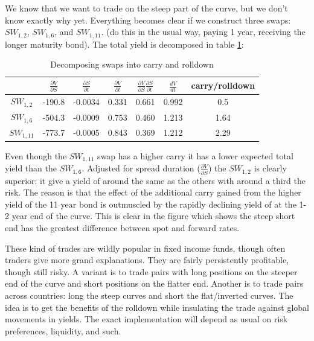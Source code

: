 We know that we want to trade on the steep part of the curve, but we don't know exactly why yet. Everything becomes clear if we construct three swaps: $SW_{1,2}$, $SW_{1,6}$, and $SW_{1,11}$. (do this in the usual way, paying 1 year, receiving the longer maturity bond). The total yield is decomposed in table \ref{tab:decomposeSwap}:

\begin{center}
\begin{table}
\begin{tabular}{|c|cccccc|}
\hline
 & $\frac{\partial V}{\partial S}$ &$\frac{\partial S}{\partial t}$ & $\frac{\partial V}{\partial t}$ & $\frac{\partial V}{\partial S}\frac{\partial S}{\partial t}$ & $\frac{d V}{d t}$ & carry/rolldown\\
 \hline
$SW_{1,2}$ & -190.8 & -0.0034 & 0.331 & 0.661 & 0.992 & 0.5\\
$SW_{1,6}$ & -504.3 & -0.0009 & 0.753 & 0.460 & 1.213 & 1.64\\
$SW_{1,11}$ & -773.7&-0.0005 & 0.843 & 0.369 & 1.212 & 2.29\\
\hline
\end{tabular}
\caption{Decomposing swaps into carry and rolldown}
\label{tab:decomposeSwap}
\end{table}
\end{center}

Even though the $SW_{1,11}$ swap has a higher carry it has a lower expected total yield than the $SW_{1,6}$. Adjusted for spread duration ($\frac{\partial V}{\partial S}$) the $SW_{1,2}$ is clearly superior: it give a yield of around the same as the others with around a third the risk. The reason is that the effect of the additional carry gained from the higher yield of the 11 year bond is outmuscled by the rapidly declining yield of at the 1-2 year end of the curve. This is clear in the figure which shows the steep short end has the greatest difference between spot and forward rates. 

These kind of trades are wildly popular in fixed income funds, though often traders give more grand explanations. They are fairly persistently profitable, though still risky. A variant is to trade pairs with long positions on the steeper end of the curve and short positions on the flatter end. Another is to trade pairs across countries: long the steep curves and short the flat/inverted curves. The idea is to get the benefits of the rolldown while insulating the trade against global movements in yields. The exact implementation will depend as usual on risk preferences, liquidity, and such.

